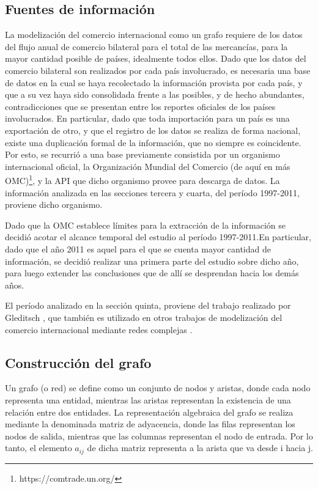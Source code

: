 \documentclass[a4paper]{article}
\begin{document}
\subsection{Fuentes de información}

La modelización del comercio internacional como un grafo requiere de los datos del flujo anual de comercio bilateral para el total de las mercancías, para la mayor cantidad posible de países, idealmente todos ellos. Dado que los datos del comercio bilateral son realizados por cada país involucrado, es necesaria una base de datos en la cual se haya recolectado la información provista por cada país, y que a su vez haya sido consolidada frente a las posibles, y de hecho abundantes, contradicciones que se presentan entre los reportes oficiales de los países involucrados. En particular, dado que toda importación para un país es una exportación de otro, y que el registro de los datos se realiza de forma nacional, existe una duplicación formal de la información, que no siempre es coincidente. Por esto, se recurrió a una base previamente consistida por un organismo internacional oficial, la Organización Mundial del Comercio (de aquí en más OMC)\footnote{https://comtrade.un.org/}, y la API que dicho organismo provee para descarga de datos. La información analizada  en las secciones tercera y cuarta, del período 1997-2011, proviene dicho organismo.   

Dado que la OMC establece límites para la extracción de la información se decidió acotar el alcance temporal del estudio al período 1997-2011.En particular, dado que el año 2011 es aquel para el que se cuenta mayor cantidad de información, se decidió realizar una primera parte del estudio sobre dicho año, para luego extender las conclusiones que de allí se desprendan hacia los demás años.
\par

El período analizado en la sección quinta, proviene del trabajo realizado por Gleditsch \cite{Gleditsch2002}, que también es utilizado en otros trabajos de modelización del comercio internacional mediante redes complejas \cite{Fagiolo2010}.

\subsection{Construcción del grafo}

Un grafo (o red) se define como un conjunto de nodos y aristas, donde cada nodo representa una entidad, mientras las aristas representan la existencia de una relación entre dos entidades. La representación algebraica del grafo se realiza mediante la denominada matriz de adyacencia, donde las filas representan los nodos de salida, mientras que las columnas representan el nodo de entrada. Por lo tanto, el elemento $a_{ij}$ de dicha matriz representa a la arista que va desde i hacia j.
\end{document}
